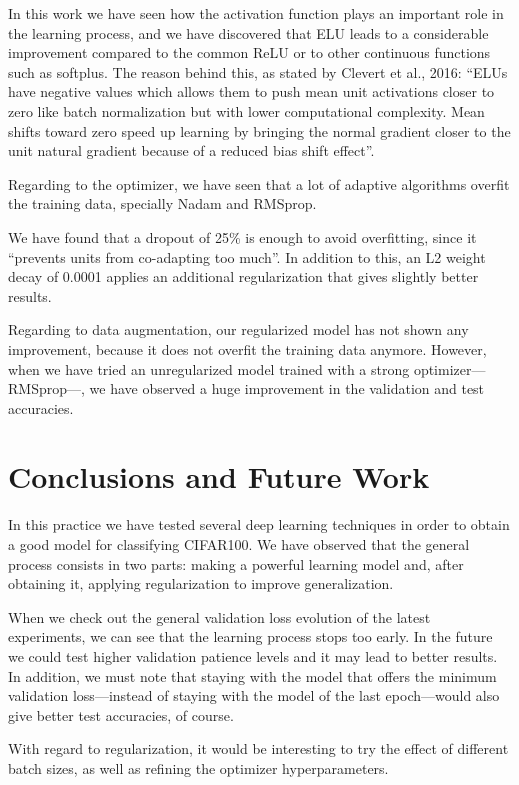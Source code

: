 \documentclass[]{article}
\begin{document}
In this work we have seen how the activation function plays an important role in the learning process, and we have discovered that ELU leads to a considerable improvement compared to the common ReLU or to other continuous functions such as softplus. The reason behind this, as stated by Clevert et al., 2016: ``ELUs have negative values which allows them to push mean unit activations closer to zero like batch normalization but with lower computational complexity. Mean shifts toward zero speed up learning by bringing the normal gradient closer to the unit natural gradient because of a reduced bias shift effect''.

Regarding to the optimizer, we have seen that a lot of adaptive algorithms overfit the training data, specially Nadam and RMSprop.

We have found that a dropout of 25\% is enough to avoid overfitting, since it ``prevents units from co-adapting too much''. \cite{srivastava2014dropout} In addition to this, an L2 weight decay of 0.0001 applies an additional regularization that gives slightly better results.

Regarding to data augmentation, our regularized model has not shown any improvement, because it does not overfit the training data anymore. However, when we have tried an unregularized model trained with a strong optimizer---RMSprop---, we have observed a huge improvement in the validation and test accuracies.

\section{Conclusions and Future Work}

In this practice we have tested several deep learning techniques in order to obtain a good model for classifying CIFAR100. We have observed that the general process consists in two parts: making a powerful learning model and, after obtaining it, applying regularization to improve generalization.

When we check out the general validation loss evolution of the latest experiments, we can see that the learning process stops too early. In the future we could test higher validation patience levels and it may lead to better results. In addition, we must note that staying with the model that offers the minimum validation loss---instead of staying with the model of the last epoch---would also give better test accuracies, of course.

With regard to regularization, it would be interesting to try the effect of different batch sizes, as well as refining the optimizer hyperparameters.
\end{document}
